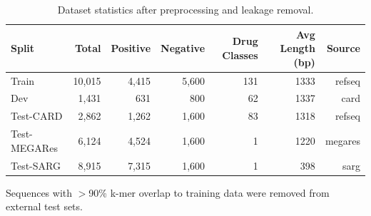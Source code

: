 \begin{table}[t]
\centering
\caption{Dataset statistics after preprocessing and leakage removal.}
\label{tab:data_summary}
\begin{tabular}{l rrrrrr}
\toprule
Split & Total & Positive & Negative & Drug Classes & Avg Length (bp) & Source \\
\midrule
Train & 10,015 & 4,415 & 5,600 & 131 & 1333 & refseq \\
Dev & 1,431 & 631 & 800 & 62 & 1337 & card \\
Test-CARD & 2,862 & 1,262 & 1,600 & 83 & 1318 & refseq \\
Test-MEGARes & 6,124 & 4,524 & 1,600 & 1 & 1220 & megares \\
Test-SARG & 8,915 & 7,315 & 1,600 & 1 & 398 & sarg \\
\bottomrule
\end{tabular}
\vspace{2mm}
\footnotesize{Sequences with $>$90\% k-mer overlap to training data were removed from external test sets.}
\end{table}
